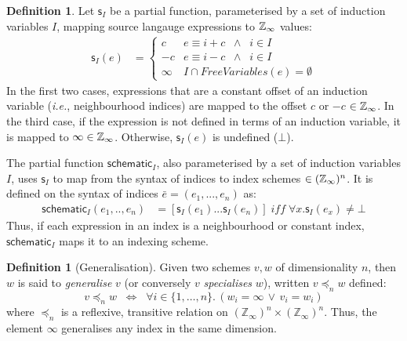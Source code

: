 \documentclass[10pt,preprint,numbers]{sigplanconf}
\newcounter{block}
\theoremstyle{definition}
\newtheorem{definition}[block]{Definition}
\newcommand{\ie}{\emph{i.e.}}
\begin{document}
\newcommand{\schemeOne}{\textsf{s}_I}
\newcommand{\schemeN}{\textsf{schematic}_I}
\begin{definition}%
\label{def:schematic}
Let $\schemeOne$ be a partial function, parameterised by a set of
induction variables $I$, mapping source langauge expressions to
$\mathbb{Z}_\infty$ values:
\begin{align*}
\schemeOne(e)
 & =  \begin{cases}
c & e \equiv i + c \;\; \wedge \;\; i \in I \\
-c & e \equiv i - c \;\; \wedge \;\; i \in I \\
\infty & \textit{$I \cap \textit{FreeVariables}(e) = \emptyset $} %
\end{cases}
\end{align*}
In the
first two cases, expressions that are a constant offset of an
induction variable (\ie{}, neighbourhood indices) are mapped to the
offset $c$ or $-c$ $\in \mathbb{Z}_\infty$. In the third case, if the
expression is not defined in terms of an induction variable, it
is mapped to $\infty \in \mathbb{Z}_\infty{}$. Otherwise, $\schemeOne(e)$
is undefined ($\bot$).

The partial function $\schemeN$, also parameterised by a set of
induction variables $I$, uses $\schemeOne$ to
 map from the syntax of indices to index schemes
$\in (\mathbb{Z}_\infty)^n$. It is defined on the syntax of indices $\bar{e} = (e_1, ..., e_n)$ as:
\begin{align*}
\schemeN(e_1, .., e_n) & =
[\schemeOne(e_1) ... \schemeOne(e_n) ]
\; \textit{iff} \; \forall x . \schemeOne(e_x) \neq \bot
\end{align*}
%
Thus, if each expression in an index is a neighbourhood or constant
index, $\schemeN$ maps it to an indexing scheme.
\end{definition}

\begin{definition}[Generalisation]
Given two schemes $v, w$ of dimensionality $n$,
then $w$ is said to \emph{generalise} $v$
(or conversely $v$ \emph{specialises} $w$),
written $v \preceq_n w$ defined:
\[
v \preceq_n w \;\; \Leftrightarrow  \;\;
  \forall i\!\in\!\{ 1, \ldots, n \} . \, (w_i = \infty \, \vee \, v_i = w_i)
\]
where $\preceq_n$ is a reflexive, transitive relation on
$(\mathbb{Z}_{\infty})^n \times (\mathbb{Z}_{\infty})^n$. Thus, the
element $\infty$ generalises any index in the same dimension.
%
\end{definition}
\end{document}
